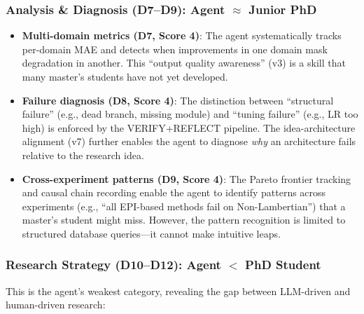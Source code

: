 \documentclass[11pt,a4paper]{article}
\begin{document}
\subsubsection{Analysis \& Diagnosis (D7--D9): Agent $\approx$ Junior PhD}

\begin{itemize}[nosep]
\item \textbf{Multi-domain metrics (D7, Score 4)}: The agent systematically tracks per-domain MAE and detects when improvements in one domain mask degradation in another.
This ``output quality awareness'' (v3) is a skill that many master's students have not yet developed.

\item \textbf{Failure diagnosis (D8, Score 4)}: The distinction between ``structural failure'' (e.g., dead branch, missing module) and ``tuning failure'' (e.g., LR too high) is enforced by the VERIFY+REFLECT pipeline.
The idea-architecture alignment (v7) further enables the agent to diagnose \emph{why} an architecture fails relative to the research idea.

\item \textbf{Cross-experiment patterns (D9, Score 4)}: The Pareto frontier tracking and causal chain recording enable the agent to identify patterns across experiments (e.g., ``all EPI-based methods fail on Non-Lambertian'') that a master's student might miss.
However, the pattern recognition is limited to structured database queries---it cannot make intuitive leaps.
\end{itemize}

\subsubsection{Research Strategy (D10--D12): Agent $<$ PhD Student}

This is the agent's weakest category, revealing the gap between LLM-driven and human-driven research:
\end{document}
